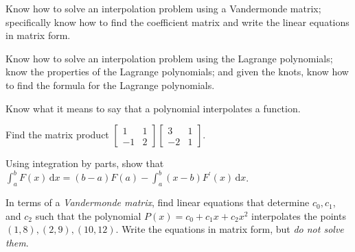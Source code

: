 \documentclass[12pt,fleqn]{exam}
\begin{document}
\begin{questions}
    \item Know how to solve an interpolation problem using a Vandermonde matrix; specifically know how to find the coefficient matrix and write the linear equations in matrix form.
    
     \item Know how to solve an interpolation problem using the Lagrange polynomials; know the properties of the Lagrange polynomials; and  given the knots, know how to find the formula for the Lagrange polynomials.
     
      
      
      \item Know what it means to say that a polynomial interpolates a function.
      
      
    
    \question   Find the matrix product \(\begin{bmatrix} 1 & 1 \\ -1 & 2 \end{bmatrix}  
\begin{bmatrix} 3 & 1 \\ -2 & 1 \end{bmatrix}\).
\begin{solution}%

\end{solution}



\question   Using integration by parts, show that \( \int_a^b F(x) \, \mathrm{d}x = (b-a) F(a) - \int_a^b (x-b) F^\prime(x) \, \mathrm{d} x \).  


\begin{solution}%

\end{solution}




\question   In terms of a \emph{Vandermonde matrix}, find linear equations that determine \(c_0,c_1\), and \(c_2\) such that the
polynomial \(P(x) = c_0  + c_1 x + c_2 x^2\) interpolates the points \((1,8), (2,9), (10,12)\). Write the equations in matrix form, but \emph{do not solve them}.


\end{questions}
\end{document}
